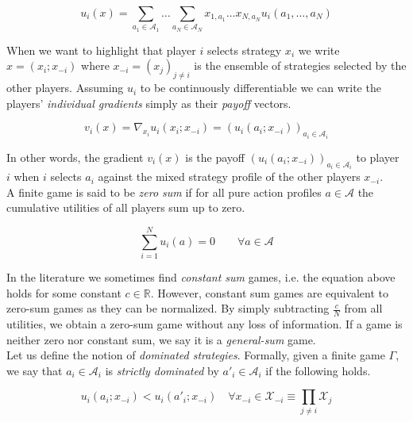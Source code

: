 \begin{equation*}
    u_i(x) = \sum_{a_1\in\mathcal{A}_1}\dots\sum_{a_N\in\mathcal{A}_N} x_{1,a_1} \dots x_{N,a_N}u_i(a_1,\dots,a_N)
\end{equation*}

When we want to highlight that player $i$ selects strategy $x_i$ we write $x = (x_i;x_{-i})$ where $x_{-i} = {(x_j)}_{j\neq i}$ is the ensemble of strategies selected by the other players. Assuming $u_i$ to be continuously differentiable we can write the players' \textit{individual gradients} simply as their \textit{payoff} vectors. 

\begin{equation*}
    v_i(x) = \nabla_{x_i}u_i(x_i;x_{-i}) = (u_i(a_i;x_{-i}))_{a_i\in\mathcal{A}_i}
\end{equation*}

In other words, the gradient $v_i(x)$ is the payoff $(u_i(a_i;x_{-i}))_{a_i\in\mathcal{A}_i}$ to player $i$ when $i$ selects $a_i$ against the mixed strategy profile of the other players $x_{-i}$. \\

A finite game is said to be \textit{zero sum} if for all pure action profiles $a \in \mathcal{A}$ the cumulative utilities of all players sum up to zero.  

\begin{equation}\label{equ:zeroSum}
    \sum_{i = 1}^{N} u_i(a)= 0 \qquad \forall a \in \mathcal{A}
\end{equation}

In the literature we sometimes find \textit{constant sum} games, i.e. the equation above holds for some constant $c \in \mathbb{R}$. However, constant sum games are equivalent to zero-sum games as they can be normalized. By simply subtracting $\frac{c}{N}$ from all utilities, we obtain a zero-sum game without any loss of information. If a game is neither zero nor constant sum, we say it is a \textit{general-sum} game.\\

Let us define the notion of \textit{dominated strategies}. Formally, given a finite game $\Gamma$, we say that $a_i \in \mathcal{A}_i$ is \textit{strictly dominated} by $a'_i \in \mathcal{A}_i$ if the following holds.

\begin{equation}\label{equ:dominatedStrategy}
    u_i(a_i;x_{-i}) < u_i(a'_i;x_{-i}) \quad \forall x_{-i} \in \mathcal{X}_{-i} \equiv \prod_{j \neq i} \mathcal{X}_j
\end{equation}

